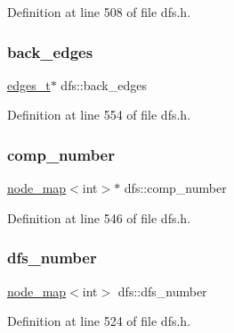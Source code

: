 Definition at line 508 of file dfs.\+h.

\mbox{\label{classdfs_a1dc18a7df8d6b238d5301c92fc7540fa}} 
\subsubsection{\texorpdfstring{back\+\_\+edges}{back\_edges}}
{\footnotesize\ttfamily \mbox{\hyperlink{edge_8h_a8f9587479bda6cf612c103494b3858e3}{edges\+\_\+t}}$\ast$ dfs\+::back\+\_\+edges\hspace{0.3cm}{\ttfamily [protected]}}



Definition at line 554 of file dfs.\+h.

\mbox{\label{classdfs_a00db016ac7eab69045cae408008890c1}} 
\subsubsection{\texorpdfstring{comp\+\_\+number}{comp\_number}}
{\footnotesize\ttfamily \mbox{\hyperlink{classnode__map}{node\+\_\+map}}$<$int$>$$\ast$ dfs\+::comp\+\_\+number\hspace{0.3cm}{\ttfamily [protected]}}



Definition at line 546 of file dfs.\+h.

\mbox{\label{classdfs_a99727f2274d6af63daae4f0518f3adbe}} 
\subsubsection{\texorpdfstring{dfs\+\_\+number}{dfs\_number}}
{\footnotesize\ttfamily \mbox{\hyperlink{classnode__map}{node\+\_\+map}}$<$int$>$ dfs\+::dfs\+\_\+number\hspace{0.3cm}{\ttfamily [protected]}}



Definition at line 524 of file dfs.\+h.

\mbox{\label{classdfs_af70a73ace68afd91ef944f984c9f28d5}} 
